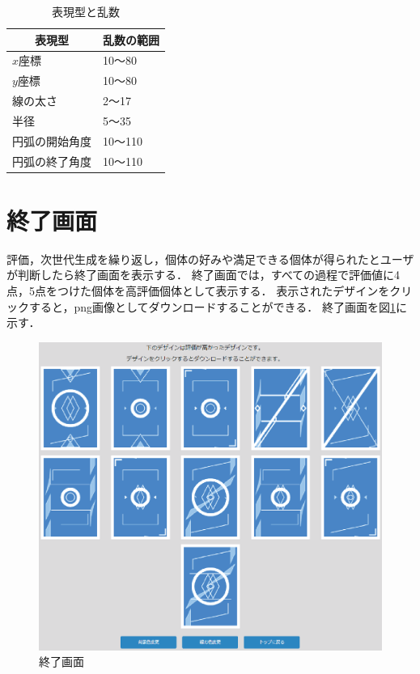 \begin{table}[t]
	\centering
	\caption{表現型と乱数}
	\begin{tabular}{|l|l|} \hline
    \multicolumn{1}{|c|}{表現型}& \multicolumn{1}{|c|}{乱数の範囲} \\ \hline
    $x$座標   & 10～80 \\ \hline
	$y$座標     & 10～80\\ \hline
	線の太さ   & 2～17 \\ \hline
	半径     & 5～35 \\ \hline 
    円弧の開始角度   & 10～110 \\ \hline 
    円弧の終了角度   & 10～110 \\ \hline  
	\end{tabular}
	\label{rand}
\end{table}


\section{終了画面}
評価，次世代生成を繰り返し，個体の好みや満足できる個体が得られたとユーザが判断したら終了画面を表示する．
終了画面では，すべての過程で評価値に4点，5点をつけた個体を高評価個体として表示する．
表示されたデザインをクリックすると，png画像としてダウンロードすることができる．
終了画面を図\ref{last}に示す．
\begin{figure}[htbp]
    \begin{center}
        \centering
        \includegraphics[scale=0.7]{image/last.eps}
        \caption{終了画面}
        \label{last}
    \end{center}
\end{figure}

